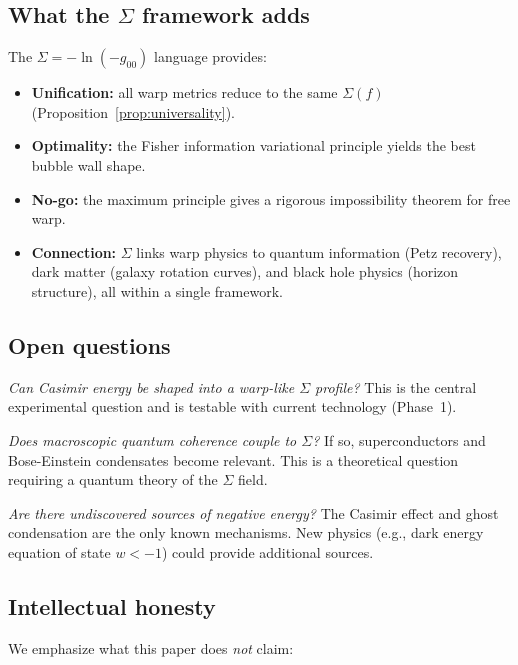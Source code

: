 \documentclass[prd,twocolumn,superscriptaddress,longbibliography]{revtex4-2}
\begin{document}
\subsection{What the $\Sigma$ framework adds}

The $\Sigma = -\ln(-g_{00})$ language provides:
\begin{itemize}
\item \textbf{Unification:} all warp metrics reduce to the same
$\Sigma(f)$ (Proposition~\ref{prop:universality}).
\item \textbf{Optimality:} the Fisher information variational
principle yields the best bubble wall shape.
\item \textbf{No-go:} the maximum principle gives a rigorous
impossibility theorem for free warp.
\item \textbf{Connection:} $\Sigma$ links warp physics to quantum
information (Petz recovery), dark matter (galaxy rotation curves),
and black hole physics (horizon structure), all within a single
framework.
\end{itemize}

\subsection{Open questions}

\textit{Can Casimir energy be shaped into a warp-like $\Sigma$
profile?}\;  This is the central experimental question and is
testable with current technology (Phase~1).

\textit{Does macroscopic quantum coherence couple to $\Sigma$?}\;
If so, superconductors and Bose-Einstein condensates become
relevant.  This is a theoretical question requiring a quantum
theory of the $\Sigma$ field.

\textit{Are there undiscovered sources of negative energy?}\;
The Casimir effect and ghost condensation are the only known
mechanisms.  New physics (e.g., dark energy equation of state
$w < -1$) could provide additional sources.

\subsection{Intellectual honesty}

We emphasize what this paper does \emph{not} claim:
\end{document}
